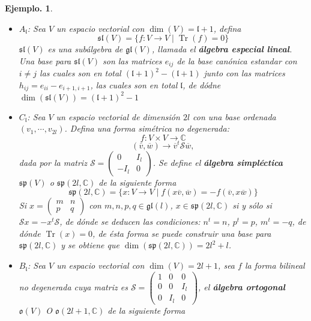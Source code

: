 \documentclass[11pt,a4paper]{article}
\newtheorem{example}{Ejemplo.}
\newcommand{\suchthat}{\mid}
\newcommand{\tr}{\mathop{Tr}}
\begin{document}
\begin{example}
\begin{itemize}
    \item $A_\mathfrak{l}$:  Sea $V$ un espacio vectorial con $\dim(V)=\mathfrak{l}+1$, defina
    $$ \mathfrak{sl}(V)= \{f:V\rightarrow V \suchthat \tr(f)=0 \}$$
    $\mathfrak{sl}(V)$ es una subálgebra de $\mathfrak{gl}(V)$, llamada el \textbf{álgebra especial lineal}.\\
    Una base para $\mathfrak{sl}(V)$ son las matrices $e_{ij}$ de la base canónica estandar con $i\neq j$ las cuales son en total $(\mathfrak{l}+1)^2- (\mathfrak{l}+1)$ junto con las matrices $h_{ij}=e_{ii}- e_{i+1,i+1}$, las cuales son en total $\mathfrak{l}$, de dódne $\dim(\mathfrak{sl}(V))=(\mathfrak{l}+1)^2-1$
    \item $C_\mathfrak{l}$: Sea $V$ un espacio vectorial de dimensión $2l$ con una base ordenada $(v_1, \cdots, v_{2l})$.  Defina una forma simétrica no degenerada: 
        $$f: V\times V \rightarrow \mathbb{C} $$
        $$(\overline{v}, \overline{w})\rightarrow \overline{v}^t \mathcal{S} \overline{w},$$
    dada por la matriz $\mathcal{S}=\begin{pmatrix}0 & I_l \\
        -I_l & 0 \end{pmatrix}$. Se define  el \textbf{álgebra simpléctica } $\mathfrak{sp}(V)$ o $\mathfrak{sp}(2l,\mathbb{C})$ de la siguiente forma
        $$\mathfrak{sp}(2l,\mathbb{C}) =\{ x: V\rightarrow V \suchthat f(x\overline{v}, \overline{w})=-f(\overline{v}, x \overline{w})\} $$
         Si $x= \begin{pmatrix} m & n \\
         p & q\end{pmatrix}$ con $m, n, p, q \in \mathfrak{gl}(l)$, $x\in \mathfrak{sp}(2l, \mathbb{C})$ si y sólo si $\mathcal{S}x= -x^t \mathcal{S}$, de dónde se deducen las condiciones: $n^t=n$, $p^t=p$, $m^t=-q$, de dónde $\tr(x)=0$, de ésta forma  se puede construir una base para $\mathfrak{sp}(2l, \mathbb{C})$ y se obtiene que $\dim(\mathfrak{sp}(2l, \mathbb{C}))=2l^2+l $. 
         \item $B_{\mathfrak{l}}$: Sea $V$ un espacio vectorial con $\dim(V)=2l+1$, sea $f$ la forma bilineal no degenerada cuya matriz es $\mathcal{S}= \begin{pmatrix}1 & 0 & 0 \\
         0 & 0 & I_{l} \\
         0 & I_{l} & 0\end{pmatrix}$, el \textbf{álgebra ortogonal } $\mathfrak{o}(V)$ O $\mathfrak{o}(2l+1, \mathbb{C})$ de la siguiente forma

\end{itemize}
\end{example}
\end{document}
